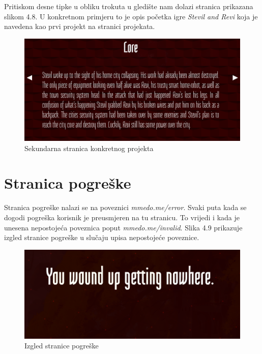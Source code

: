 \documentclass[times, utf8, zavrsni, numeric]{fer}
\begin{document}
Pritiskom desne tipke u obliku trokuta u gledište nam dolazi stranica prikazana slikom 4.8.
U konkretnom primjeru to je opis početka igre \textit{Stevil and Revi} koja je navedena kao prvi projekt na stranici projekata.

\begin{figure}[htb]
				\centering
				\includegraphics[width=14.6cm]{images/lore.png}
				\caption{Sekundarna stranica konkretnog projekta}
				\label{fig:lore}
\end{figure}

\section{Stranica pogreške}
\qquad Stranica pogreške nalazi se na poveznici \textit{mmedo.me/error}.
Svaki puta kada se dogodi pogreška korisnik je preusmjeren na tu stranicu.
To vrijedi i kada je unesena nepostojeća poveznica poput \textit{mmedo.me/invalid}.
Slika 4.9 prikazuje izgled stranice pogreške u slučaju upisa nepostojeće poveznice.

\begin{figure}[htb]
				\centering
				\includegraphics[width=14.6cm]{images/error.png}
				\caption{Izgled stranice pogreške}
				\label{fig:error}
\end{figure}
\end{document}
